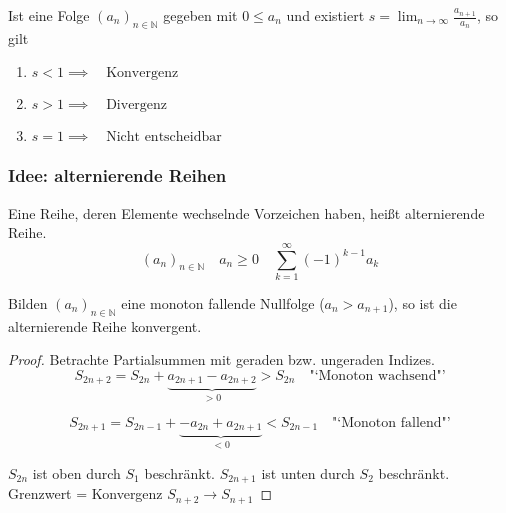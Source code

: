 \begin{theorem}[Quotientenkriterium]
	Ist eine Folge \( (a_n)_{n \in \mathbb{N} } \) gegeben mit \( 0 \leq a_n \) und existiert \( s = \lim_{n\rightarrow\infty} \frac{a_{n+1}}{a_n} \), so gilt
	\begin{enumerate}
		\item \( s < 1 \implies \quad \text{Konvergenz} \)
		\item \( s > 1 \implies \quad \text{Divergenz} \)
		\item \( s = 1 \implies \quad \text{Nicht entscheidbar} \)
	\end{enumerate}
\end{theorem}

\subsubsection{Idee: alternierende Reihen} %
\label{sub:idee_alternierende_reihen}

\begin{definition}
	Eine Reihe, deren Elemente wechselnde Vorzeichen haben, heißt alternierende Reihe.
	\[
		(a_n)_{n \in \mathbb{N} } \quad a_n \geq 0 \quad \sum_{k=1}^\infty (-1)^{k-1}a_k
	\]
\end{definition}

\begin{theorem}
	Bilden \( (a_n)_{n\in \mathbb{N}} \) eine monoton fallende Nullfolge (\( a_n>a_{n+1} \)), so ist die alternierende Reihe konvergent.
\end{theorem}

\begin{proof}
	Betrachte Partialsummen mit geraden bzw. ungeraden Indizes.
	\[
		S_{2n+2} = S_{2n} + \underbrace{a_{2n+1}-a_{2n+2}}_{>0} > S_{2n} \quad \text{"`Monoton wachsend"'}
	\]
	
	\[
		S_{2n+1} = S_{2n-1} + \underbrace{-a_{2n}+a_{2n+1}}_{<0} < S_{2n-1} \quad \text{"`Monoton fallend"'}
	\]
	
	\noindent \( S_{2n} \) ist oben durch \( S_1 \) beschränkt. \newline
	\noindent \( S_{2n+1} \) ist unten durch \( S_2 \) beschränkt. \newline\newline
	\noindent Grenzwert = Konvergenz \( S_{n+2}\rightarrow S_{n+1} \)
\end{proof}

